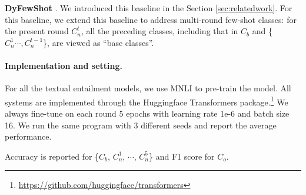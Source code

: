 \documentclass[11pt]{article}
\begin{document}


    
\textbullet\enspace \textbf{DyFewShot} \cite{DBLPGidarisK18}. We introduced this baseline in the Section \ref{sec:relatedwork}. 
For this baseline, we extend this baseline to address multi-round few-shot classes: for the present round $C_n^t$, all the preceding classes, including that in $C_b$ and \{$C_n^1\cdots, C_n^{t-1}$\}, are viewed as ``base classes''.


\paragraph{Implementation and setting.}
For all the textual entailment models, we use MNLI \cite{williams2018broad} to pre-train the model.
All systems are implemented through the Huggingface Transformers package.\footnote{\url{https://github.com/huggingface/transformers}} We always fine-tune on each round 5 epochs with learning rate 1e-6 and batch size 16. We run the same program with 3 different seeds and report the average performance. 

Accuracy is reported for \{$C_b$, $C_n^1$, $\cdots$, $C_n^5$\} and F1 score for $C_o$.
\end{document}
